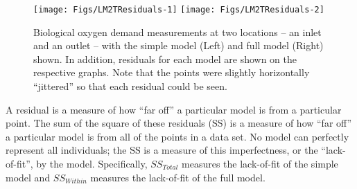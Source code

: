 \documentclass[10pt,openany]{book}\usepackage[]{graphicx}\usepackage[]{color}
\newenvironment{knitrout}{}{} %
\begin{document}
\begin{knitrout}
\color{fgcolor}\begin{figure}[hbtp]

{\centering \texttt{[image: Figs/LM2TResiduals-1]} 
\texttt{[image: Figs/LM2TResiduals-2]} 

}

\caption[Biological oxygen demand measurements at two locations -- an inlet and an outlet -- with the simple model (Left) and full model (Right) shown]{Biological oxygen demand measurements at two locations -- an inlet and an outlet -- with the simple model (Left) and full model (Right) shown.  In addition, residuals for each model are shown on the respective graphs.  Note that the points were slightly horizontally ``jittered'' so that each residual could be seen.}\label{fig:LM2TResiduals}
\end{figure}


\end{knitrout}

A residual is a measure of how ``far off'' a particular model is from a particular point.  The sum of the square of these residuals (SS) is a measure of how ``far off'' a particular model is from all of the points in a data set.  No model can perfectly represent all individuals; the SS is a measure of this imperfectness, or the ``lack-of-fit'', by the model.  Specifically, $SS_{Total}$ measures the lack-of-fit of the simple model and $SS_{Within}$ measures the lack-of-fit of the full model.


\vspace{-12pt}
\end{document}
